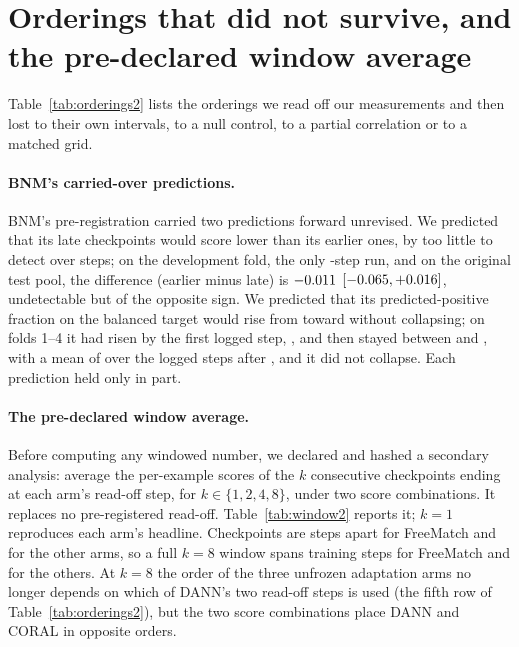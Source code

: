 \section{Orderings that did not survive, and the pre-declared window average}
\label{sec:failed}

Table~\ref{tab:orderings2} lists the orderings we read off our measurements and then lost to
their own intervals, to a null control, to a partial correlation or to a matched grid.



\paragraph{BNM's carried-over predictions.} BNM's pre-registration carried two predictions
forward unrevised. We predicted that its late checkpoints would score lower than its earlier
ones, by too little to detect over \bnmDecayCap{} steps; on the development fold, the only
\bnmDecayCap{}-step run, and on the original test pool, the difference (earlier minus late) is
$-0.011{}$ $[-0.065{}, +0.016{}]$, undetectable but of the opposite sign. We
predicted that its predicted-positive fraction on the balanced target would rise from
\bnmPredPosStart{} toward \bnmPredPosTarget{} without collapsing; on folds 1--4 it had risen by
the first logged step, \bnmPredPosFirstStep{}, and then stayed between \bnmPredPosMin{} and
\bnmPredPosMax{}, with a mean of \bnmPredPosLate{} over the logged steps after
\bnmPredPosLateFrom{}, and it did not collapse. Each prediction held only in part.

\paragraph{The pre-declared window average.}
\label{sec:resolution-fix}
\label{sec:resolution-diagnosis}
Before computing any windowed number, we declared and hashed a secondary analysis: average the
per-example scores of the $k$ consecutive checkpoints ending at each arm's read-off step, for
$k \in \{1, 2, 4, 8\}$, under two score combinations. It replaces no pre-registered read-off.
Table~\ref{tab:window2} reports it; $k=1$ reproduces each arm's headline. Checkpoints are \ckptFm{} steps apart for FreeMatch and \ckptOther{} for the other arms, so a full $k=8$ window spans \winEightSpanFm{} training steps for FreeMatch and \winEightSpanOther{} for the others. At $k=8$ the order of
the three unfrozen adaptation arms no longer depends on which of DANN's two read-off steps is
used (the fifth row of Table~\ref{tab:orderings2}), but the two score combinations place DANN
and CORAL in opposite orders.

